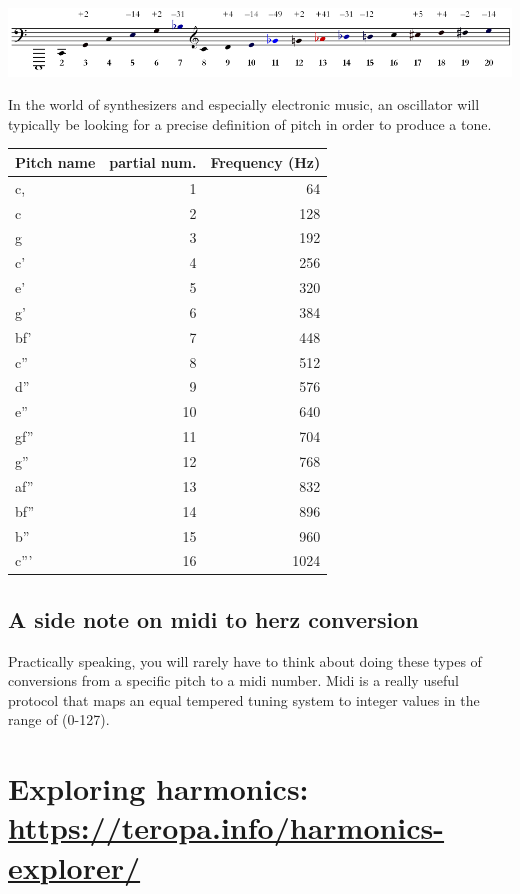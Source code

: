 \documentclass[11pt]{article}
\begin{document}
\begin{center}
\includegraphics[width=.9\linewidth]{./images/Harmonic_Series1.png}
\end{center}

In the world of synthesizers and especially electronic music, an
oscillator will typically be looking for a precise definition of pitch
in order to produce a tone. 

\begin{center}
\begin{tabular}{lrr}
Pitch name & partial num. & Frequency (Hz)\\
\hline
c, & 1 & 64\\
c & 2 & 128\\
g & 3 & 192\\
c' & 4 & 256\\
e' & 5 & 320\\
g' & 6 & 384\\
bf' & 7 & 448\\
c'' & 8 & 512\\
d'' & 9 & 576\\
e'' & 10 & 640\\
gf'' & 11 & 704\\
g'' & 12 & 768\\
af'' & 13 & 832\\
bf'' & 14 & 896\\
b'' & 15 & 960\\
c''' & 16 & 1024\\
\end{tabular}
\end{center}


\subsection{A side note on midi to herz conversion}
\label{sec:org816d9e2}
Practically speaking, you will rarely have to think about doing these
types of conversions from a specific pitch to a midi number. Midi is a
really useful protocol that maps an equal tempered tuning system to
integer values in the range of (0-127).


\section{Exploring harmonics: \url{https://teropa.info/harmonics-explorer/}}
\label{sec:org9d45ec8}
\end{document}
